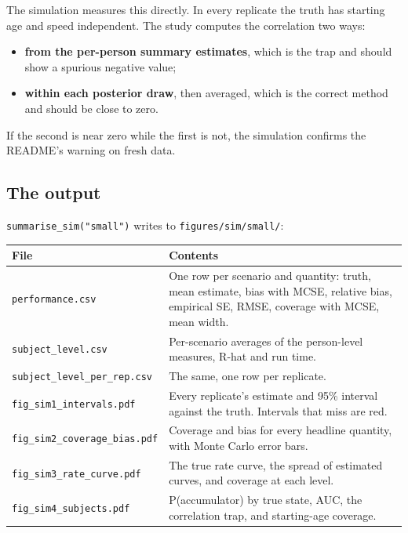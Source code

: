 \documentclass[11pt]{article}
\newcommand{\code}[1]{\texttt{\small #1}}
\begin{document}
The simulation measures this directly. In every replicate the truth has starting age and speed independent. The study computes the correlation two ways:

\begin{itemize}
  \item \textbf{from the per-person summary estimates}, which is the trap and should show a spurious negative value;
  \item \textbf{within each posterior draw}, then averaged, which is the correct method and should be close to zero.
\end{itemize}

If the second is near zero while the first is not, the simulation confirms the README's warning on fresh data.

\subsection{The output}

\code{summarise\_sim("small")} writes to \code{figures/sim/small/}:

\begin{center}
\small
\begin{tabularx}{\textwidth}{@{}l X@{}}
\toprule
File & Contents \\
\midrule
\code{performance.csv} & One row per scenario and quantity: truth, mean estimate, bias with MCSE, relative bias, empirical SE, RMSE, coverage with MCSE, mean width. \\
\code{subject\_level.csv} & Per-scenario averages of the person-level measures, R-hat and run time. \\
\code{subject\_level\_per\_rep.csv} & The same, one row per replicate. \\
\code{fig\_sim1\_intervals.pdf} & Every replicate's estimate and 95\% interval against the truth. Intervals that miss are red. \\
\code{fig\_sim2\_coverage\_bias.pdf} & Coverage and bias for every headline quantity, with Monte Carlo error bars. \\
\code{fig\_sim3\_rate\_curve.pdf} & The true rate curve, the spread of estimated curves, and coverage at each level. \\
\code{fig\_sim4\_subjects.pdf} & P(accumulator) by true state, AUC, the correlation trap, and starting-age coverage. \\
\bottomrule
\end{tabularx}
\end{center}
\end{document}
